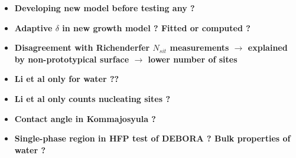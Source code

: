 \documentclass[8pt, a4paper]{article}
\begin{document}
\begin{itemize}
\item \textbf{Developing new model before testing any ?}



\item \textbf{Adaptive $\delta$ in new growth model ? Fitted or computed ?}



\item \textbf{Disagreement with Richenderfer $N_{sit}$ measurements $\rightarrow$ explained by non-prototypical surface $\rightarrow$ lower number of sites}



\item \textbf{Li et al only for water ?? }



\item \textbf{Li et al only counts nucleating sites ?}



\item \textbf{Contact angle in Kommajosyula ?}



\item \textbf{Single-phase region in HFP test of DEBORA ? Bulk properties of water ?}

\end{itemize}
\end{document}
